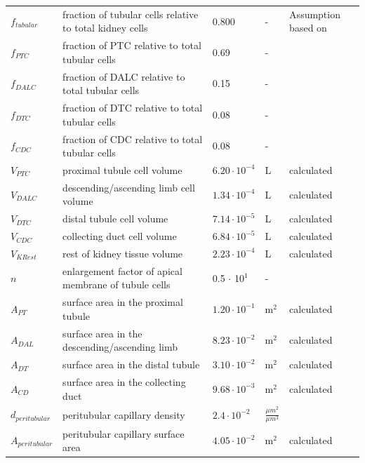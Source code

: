 \documentclass[preprint,12pt,authoryear]{elsarticle}
\begin{document}
\begin{longtable}{P{2cm}P{3.5cm}P{2cm}P{1cm}P{2.5cm}}
$f_{tubular}$ & fraction of tubular cells  relative to total kidney cells & 0.800 & - & Assumption based on \citet{wang_2024}\\
$f_{PTC}$ & fraction of PTC relative to total tubular cells & 0.69 & - & \citep{clark_2019} \\
$f_{DALC}$ & fraction of DALC relative to total tubular cells & 0.15 & - &  \citep{clark_2019}\\
$f_{DTC}$ & fraction of DTC relative to total tubular cells & 0.08 & - &  \citep{clark_2019}\\
$f_{CDC}$ & fraction of CDC relative to total tubular cells & 0.08 & - &  \citep{clark_2019} \\

$V_{PTC}$ & proximal tubule cell volume & $6.20 \cdot 10^{-4}$ & $\text{L}$ & calculated \\
$V_{DALC}$ & descending/ascending limb cell volume & $1.34 \cdot 10^{-4}$ & $\text{L}$ & calculated \\
$V_{DTC}$ & distal tubule cell volume & $7.14 \cdot 10^{-5}$ & $\text{L}$ & calculated \\
$V_{CDC}$ & collecting duct cell volume & $6.84 \cdot 10^{-5}$ & $\text{L}$ & calculated \\
$V_{KRest}$ & rest of kidney tissue volume & $2.23 \cdot 10^{-4}$ & $\text{L}$ & calculated \\
\midrule\midrule

$n$ & enlargement factor of apical membrane of tubule cells & 0.5 $\cdot$ 10$^1$ & - & \citep{desesso_2001} \\

$A_{PT}$   & surface area in the proximal tubule & $1.20 \cdot 10^{-1}$ & $\text{m}^2$ & calculated \\
$A_{DAL}$  & surface area in the descending/ascending limb & $8.23 \cdot 10^{-2}$ & $\text{m}^2$ & calculated \\
$A_{DT}$   & surface area in the distal tubule & $3.10 \cdot 10^{-2}$ & $\text{m}^2$ & calculated \\
$A_{CD}$   & surface area in the collecting duct & $9.68 \cdot 10^{-3}$ & $\text{m}^2$ & calculated \\
$d_{peritubular}$ & peritubular capillary density & $2.4 \cdot 10^{-2}$&$\frac{\mu m^2}{\mu m^3}$ & \citep{gazzard_2025} \\
$A_{peritubular}$ & peritubular capillary surface area & $4.05 \cdot 10^{-2}$ & $\text{m}^2$ & calculated \\
\midrule\midrule


\end{longtable}
\end{document}
